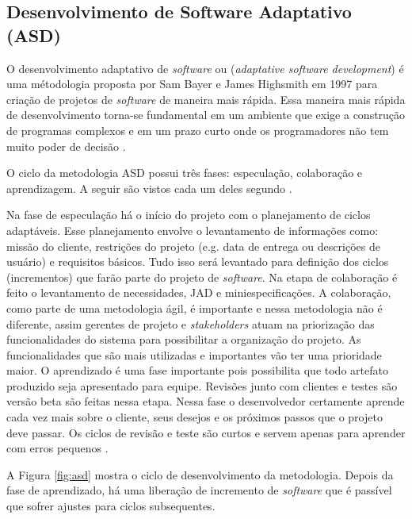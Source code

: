 \subsection{Desenvolvimento de Software Adaptativo (ASD)}
 
O desenvolvimento adaptativo de \textit{software} ou (\textit{adaptative software development}) é uma métodologia proposta por Sam Bayer e James Highsmith em 1997 para criação de projetos de \textit{software} de maneira mais rápida. Essa maneira mais rápida de desenvolvimento torna-se fundamental em um ambiente que exige a construção de programas complexos e em um prazo curto onde os programadores não tem muito poder de decisão \cite{pressman:11} \cite{macedo:12}. 

O ciclo da metodologia ASD possui três fases: especulação, colaboração e aprendizagem. A seguir são vistos cada um deles segundo .

Na fase de especulação há o início do projeto com o planejamento de ciclos adaptáveis. Esse planejamento envolve o levantamento de informações como: missão do cliente, restrições do projeto (e.g. data de entrega ou descrições de usuário) e requisitos básicos. Tudo isso será levantado para definição dos ciclos (incrementos) que farão parte do projeto de \textit{software}. Na etapa de colaboração é feito o levantamento de necessidades, JAD e miniespecificações. A colaboração, como parte de uma metodologia ágil, é importante e nessa metodologia não é diferente, assim gerentes de projeto e \textit{stakeholders} atuam na priorização das funcionalidades do sistema para possibilitar a organização do projeto. As funcionalidades que são mais utilizadas e importantes vão ter uma prioridade maior. O aprendizado é uma fase importante pois possibilita que todo artefato produzido seja apresentado para equipe. Revisões junto com clientes e testes são versão beta são feitas nessa etapa. Nessa fase o desenvolvedor certamente aprende cada vez mais sobre o cliente, seus desejos e os próximos passos que o projeto deve passar. Os ciclos de revisão e teste são curtos e servem apenas para aprender com erros pequenos \cite{macedo:12} \cite{pressman:11}. 

A Figura \ref{fig:asd} mostra o ciclo de desenvolvimento da metodologia. Depois da fase de aprendizado, há uma liberação de incremento de \textit{software} que é passível que sofrer ajustes para ciclos subsequentes.

